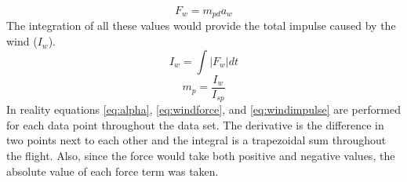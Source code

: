 %
%
\begin{equation}\label{eq:windforce}
F_w = m_{pd}a_w
\end{equation}%
%
The integration of all these values would provide the total impulse caused by the wind ($I_w$).
\begin{equation}\label{eq:windimpulse}
I_w=\int |F_w| dt
\end{equation}%
\begin{equation}\label{eq:propmass}
m_p=\frac{I_w}{I_{sp}}
\end{equation}
In reality equations \ref{eq:alpha}, \ref{eq:windforce}, and \ref{eq:windimpulse} are performed for each data point throughout the data set. The derivative is the difference in two points next to each other and the integral is a trapezoidal sum throughout the flight. Also, since the force would take both positive and negative values, the absolute value of each force term was taken.
